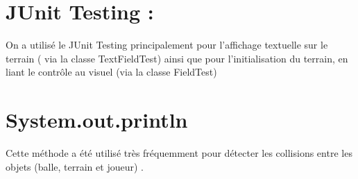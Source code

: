 \section{JUnit Testing :}

On a utilisé le JUnit Testing principalement pour l'affichage textuelle sur le terrain ( via la classe TextFieldTest) ainsi que pour l'initialisation du terrain, en liant le contrôle au visuel (via la classe FieldTest)

\section{System.out.println}

Cette méthode a été utilisé très fréquemment pour détecter les collisions entre les objets (balle, terrain et joueur) .